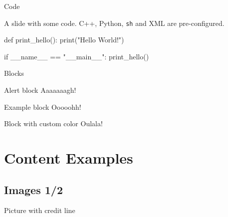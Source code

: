 \documentclass[compress]{beamer}
\begin{document}
\begin{frame}[fragile]{Code}

    A slide with some code. C++, Python, \texttt{sh} and XML are pre-configured.

    \begin{pythoncode}

        def print_hello():
        print("Hello World!")


        if __name__ == "__main__":
        print_hello()
    \end{pythoncode}

\end{frame}


\begin{frame}[containsverbatim]{Blocks}
\begin{alertblock}{Alert block}
    Aaaaaaagh!
\end{alertblock}

\begin{exampleblock}{Example block}
    Ooooohh!
\end{exampleblock}

\begingroup
{}
\begin{block}{Block with custom color}
    Oulala!
\end{block}
\endgroup
\end{frame}



\section{Content Examples}

\subsection{Images 1/2}
\begin{frame}{Picture with credit line}
    \begin{figure}
        \centering
    \end{figure}
\end{frame}

\end{document}
